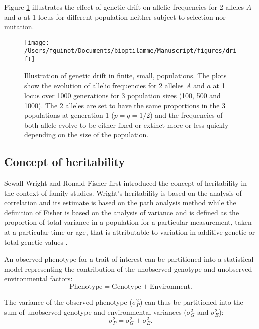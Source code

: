 \documentclass[]{book}
\begin{document}
Figure \ref{fig:drift} illustrates the effect of genetic drift on allelic
frequencies for 2 alleles \(A\) and \(a\) at 1 locus for different
population neither subject to selection nor mutation.



\begin{figure}

{\centering \texttt{[image: /Users/fguinot/Documents/bioptilamme/Manuscript/figures/drift]} 

}

\caption{Illustration of genetic drift in finite, small, populations. The plots show the evolution of allelic frequencies for 2 alleles \(A\) and \(a\) at 1 locus over 1000 generations for 3 population sizes (100, 500 and 1000). The 2 alleles are set to have the same proportions in the 3 populations at generation 1 (\(p = q = 1/2\)) and the frequencies of both allele evolve to be either fixed or extinct more or less quickly depending on the size of the population.}\label{fig:drift}
\end{figure}

\hypertarget{concept-of-heritability}{%
\subsection{Concept of heritability}\label{concept-of-heritability}}

Sewall Wright and Ronald Fisher first introduced the concept of
heritability in the context of family studies. Wright's heritability is
based on the analysis of correlation and its estimate is based on the
path analysis method \citep{wright1921correlation} while the definition of
Fisher is based on the analysis of variance and is defined as the
proportion of total variance in a population for a particular
measurement, taken at a particular time or age, that is attributable to
variation in additive genetic or total genetic values \citep{fisher1919xv}.

An observed phenotype for a trait of interest can be partitioned into a
statistical model representing the contribution of the unobserved
genotype and unobserved environmental factors:
\[\text{Phenotype}  = \text{Genotype} + \text{Environment}.\]

The variance of the observed phenotype (\(\sigma^2_P\)) can thus be
partitioned into the sum of unobserved genotype and environmental
variances (\(\sigma^2_G\) and \(\sigma^2_E\)):
\[\sigma^2_P = \sigma^2_G + \sigma^2_E.\]
\end{document}
